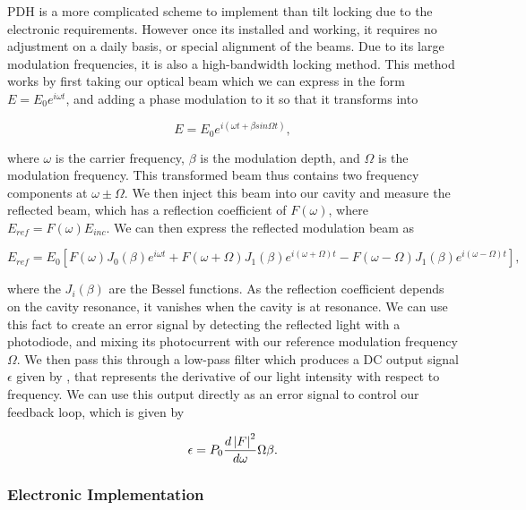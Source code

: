 PDH is a more complicated scheme to implement than tilt locking due to the electronic requirements.  However once its installed and working, it requires no adjustment on a daily basis, or special alignment of the beams.  Due to its large modulation frequencies, it is also a high-bandwidth locking method.  This method works by first taking our optical beam which we can express in the form $E=E_0 e^{i \omega t}$, and adding a phase modulation to it so that it transforms into 

\begin{equation}
  \label{eq:pdh_modulated}
  E=E_0 e^{i (\omega t + \beta sin \Omega t)} ,
\end{equation}

\noindent
where $\omega$  is the carrier frequency, $\beta$ is the modulation depth, and $\Omega $ is the modulation frequency.  This transformed beam thus contains two frequency components at $ \omega \pm \Omega $.  We then inject this beam into our cavity and measure the reflected beam, which has a reflection coefficient of $F(\omega )$, where $E_{ref} = F(\omega )E_{inc}$.  We can then express the reflected modulation beam as \cite{black4notes}

\begin{equation}
  \label{eq:pdh_ref_mod}
  E_{ref} = E_0 [ F(\omega ) J_0(\beta) e^{i \omega t} + F(\omega + \Omega
)J_1(\beta) e^{i (\omega + \Omega ) t} - F(\omega - \Omega ) J_1(\beta)
e^{i(\omega - \Omega )t} ]  ,
\end{equation}

\noindent
where the $J_i(\beta)$ are the Bessel functions.  As the reflection
coefficient depends on the cavity resonance, it vanishes when the cavity is at
resonance.  We can use this fact to create an error signal by detecting the
reflected light with a photodiode, and mixing its photocurrent with our
reference modulation frequency $\Omega $.  We then pass this through a
low-pass filter which produces a DC output signal $\epsilon$ given by
, that represents the derivative of our light
intensity with respect to frequency.  We can use this output directly as an
error signal to control our feedback loop, which is given by \cite{black79}

\begin{equation}
  \label{eq:pdh_slow_modulation}
  \epsilon = P_0 \frac{d \left| F \right|^2}{d \omega } \Omega \beta .
\end{equation}

\subsubsection{Electronic Implementation}
\label{electronic_implementation} 

